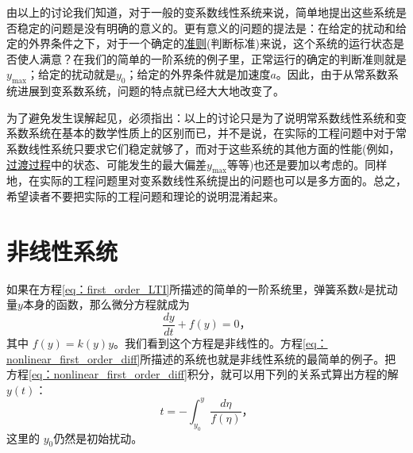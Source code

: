 由以上的讨论我们知道，对于一般的变系数线性系统来说，简单地提出这些系统是否稳定的问题是没有明确的意义的。更有意义的问题的提法是：在给定的扰动和给定的外界条件之下，对于一个确定的\underline{准则}(判断标准)来说，这个系统的运行状态是否使人满意？在我们的简单的一阶系统的例子里，正常运行的确定的判断准则就是$y_{\max}$；给定的扰动就是$y_0$；给定的外界条件就是加速度$a$。因此，由于从常系数系统进展到变系数系统，问题的特点就已经大大地改变了。

为了避免发生误解起见，必须指出：以上的讨论只是为了说明常系数线性系统和变系数系统在基本的数学性质上的区别而已，并不是说，在实际的工程问题中对于常系数线性系统只要求它们稳定就够了，而对于这些系统的其他方面的性能(例如，\underline{过渡过程}中的状态、可能发生的最大偏差$y_{\max}$等等)也还是要加以考虑的。同样地，在实际的工程问题里对变系数线性系统提出的问题也可以是多方面的。总之，希望读者不要把实际的工程问题和理论的说明混淆起来。

\section{非线性系统}\label{chapter1_section3}

如果在方程\eqref{eq：first_order_LTI}所描述的简单的一阶系统里，弹簧系数$k$是扰动量$y$本身的函数，那么微分方程就成为
\begin{equation}\label{eq：nonlinear_first_order_diff}
\frac{dy}{dt} + f(y) = 0，
\end{equation}
其中 $f(y)=k(y)y$。我们看到这个方程是非线性的。方程\eqref{eq：nonlinear_first_order_diff}所描述的系统也就是非线性系统的最简单的例子。把方程\eqref{eq：nonlinear_first_order_diff}积分，就可以用下列的关系式算出方程的解 $y(t)$：
\begin{equation}
t=-\int_{y_0}^y \frac{d\eta}{f(\eta)}，
\end{equation}
这里的 $y_0$仍然是初始扰动。

